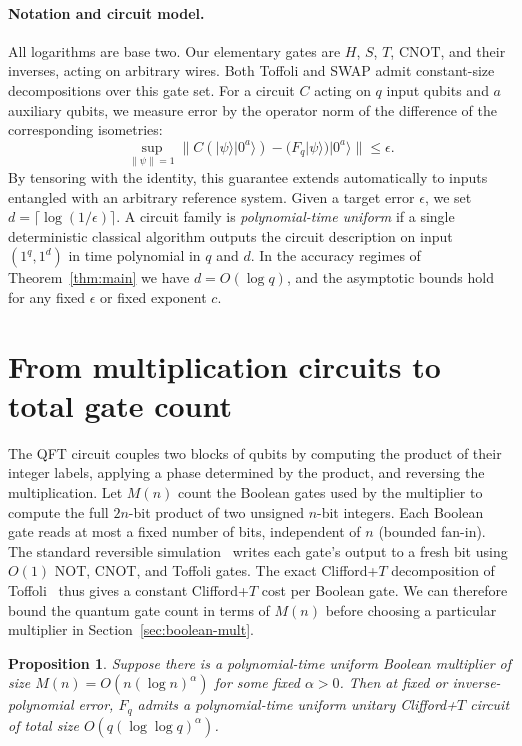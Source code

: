 \documentclass[11pt]{article}
\newtheorem{proposition}[theorem]{Proposition}
\newcommand{\CFT}{Clifford+$T$}
\begin{document}
\paragraph{Notation and circuit model.}
All logarithms are base two. Our elementary gates are $H$, $S$, $T$, $\mathrm{CNOT}$, and their inverses, acting on arbitrary wires. Both Toffoli and SWAP admit constant-size decompositions over this gate set. For a circuit $C$ acting on $q$ input qubits and $a$ auxiliary qubits, we measure error by the operator norm of the difference of the corresponding isometries:
\begin{equation}\label{eq:error-criterion}
\sup_{\|\psi\|=1} \bigl\| C(|\psi\rangle|0^a\rangle) - (F_q|\psi\rangle)|0^a\rangle \bigr\| \le \epsilon.
\end{equation}
By tensoring with the identity, this guarantee extends automatically to inputs entangled with an arbitrary reference system. Given a target error $\epsilon$, we set $d = \lceil \log(1/\epsilon) \rceil$. A circuit family is \emph{polynomial-time uniform} if a single deterministic classical algorithm outputs the circuit description on input $(1^q, 1^d)$ in time polynomial in $q$ and $d$. In the accuracy regimes of Theorem~\ref{thm:main} we have $d = O(\log q)$, and the asymptotic bounds hold for any fixed $\epsilon$ or fixed exponent $c$.

\section{From multiplication circuits to total gate count}\label{sec:reduction}

The QFT circuit couples two blocks of qubits by computing the product of their integer labels, applying a phase determined by the product, and reversing the multiplication. Let $M(n)$ count the Boolean gates used by the multiplier to compute the full $2n$-bit product of two unsigned $n$-bit integers. Each Boolean gate reads at most a fixed number of bits, independent of $n$ (bounded fan-in). The standard reversible simulation~\cite[Section~2]{kmps2026} writes each gate's output to a fresh bit using $O(1)$ NOT, CNOT, and Toffoli gates. The exact \CFT{} decomposition of Toffoli~\cite[Eq.~(1)]{selinger2013} thus gives a constant \CFT{} cost per Boolean gate. We can therefore bound the quantum gate count in terms of $M(n)$ before choosing a particular multiplier in Section~\ref{sec:boolean-mult}.

\begin{proposition}\label{prop:general-alpha}
Suppose there is a polynomial-time uniform Boolean multiplier of size $M(n) = O(n(\log n)^\alpha)$ for some fixed $\alpha > 0$. Then at fixed or inverse-polynomial error, $F_q$ admits a polynomial-time uniform unitary \CFT{} circuit of total size $O(q(\log\log q)^\alpha)$.
\end{proposition}
\end{document}
